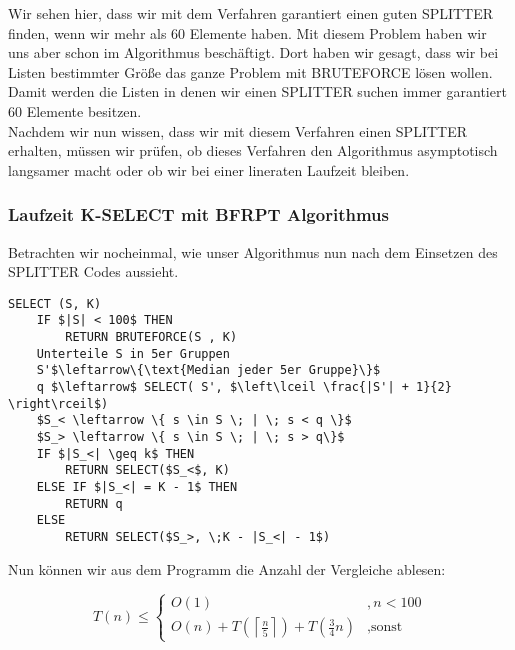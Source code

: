 \begin{description}
\begin{description}
Wir sehen hier, dass wir mit dem Verfahren garantiert einen guten SPLITTER finden, wenn wir mehr als 60 Elemente haben. Mit diesem Problem haben wir uns aber schon im Algorithmus beschäftigt. Dort haben wir gesagt, dass wir bei Listen bestimmter Größe das ganze Problem mit BRUTEFORCE lösen wollen. Damit werden die Listen in denen wir einen SPLITTER suchen immer garantiert 60 Elemente besitzen.\vspace{\baselineskip}\\
Nachdem wir nun wissen, dass wir mit diesem Verfahren einen SPLITTER erhalten, müssen wir prüfen, ob dieses Verfahren den Algorithmus asymptotisch langsamer macht oder ob wir bei einer lineraten Laufzeit bleiben.

\end{description}

\end{description}

\subsubsection{Laufzeit K-SELECT mit BFRPT Algorithmus}

Betrachten wir nocheinmal, wie unser Algorithmus nun nach dem Einsetzen des SPLITTER Codes aussieht.

\begin{lstlisting}
SELECT (S, K)
	IF $|S| < 100$ THEN
		RETURN BRUTEFORCE(S , K)
	Unterteile S in 5er Gruppen
	S'$\leftarrow\{\text{Median jeder 5er Gruppe}\}$
	q $\leftarrow$ SELECT( S', $\left\lceil \frac{|S'| + 1}{2} \right\rceil$)
	$S_< \leftarrow \{ s \in S \; | \; s < q \}$
	$S_> \leftarrow \{ s \in S \; | \; s > q\}$
	IF $|S_<| \geq k$ THEN
		RETURN SELECT($S_<$, K)
	ELSE IF $|S_<| = K - 1$ THEN
		RETURN q
	ELSE
		RETURN SELECT($S_>, \;K - |S_<| - 1$)
\end{lstlisting}

Nun können wir aus dem Programm die Anzahl der Vergleiche ablesen:

$$
T(n) \leq \left\{ \begin{array}{lr} O(1) &, n<100\\ O(n) + T\left( \left\lceil \frac{n}{5}\right\rceil \right) + T\left( \frac{3}{4}n \right) & , \text{sonst}\end{array}\right.
$$

